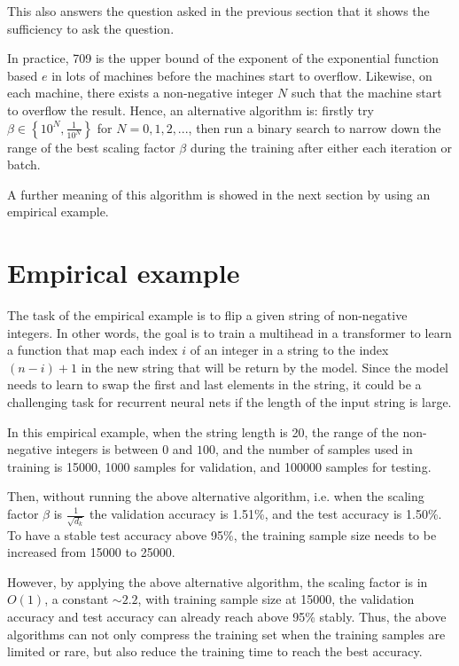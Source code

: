 \documentclass{article}
\theoremstyle{plain}
\theoremstyle{plain} %
\theoremstyle{definition}  %
\theoremstyle{remark}  %
\theoremstyle{plain}
\begin{document}
This also answers the question asked in the previous section that it shows the sufficiency to ask the question.


In practice, 709 is the upper bound of the exponent of the exponential function based $e$ in lots of machines before the machines start to overflow. Likewise, on each machine, there exists a non-negative integer $N$ such that the machine start to overflow the result. Hence, an alternative algorithm is: firstly try $ \beta \in \left\lbrace 10^N, \frac{1}{10^N} \right\rbrace$ for $N=0,1,2,...$, then run a binary search to narrow down the range of the best scaling factor $\beta$ during the training after either each iteration or batch.

A further meaning of this algorithm is showed in the next section by using an empirical example.


\section{Empirical example}

The task of the empirical example is to flip a given string of non-negative integers. In other words, the goal is to train a multihead in a transformer to learn a function that map each index $i$ of an integer in a string to the index $(n-i)+1$ in the new string that will be return by the model. Since the model needs to learn to swap the first and last elements in the string, it could be a challenging task for recurrent neural nets if the length of the input string is large.

In this empirical example, when the string length is 20, the range of the non-negative integers is between $0$ and $100$, and the number of samples used in training is 15000, 1000 samples for validation, and 100000 samples for testing. 

Then, without running the above alternative algorithm, i.e. when the scaling factor $\beta$ is $\frac{1}{\sqrt{d_k}}$ the validation accuracy is 1.51\%, and the test accuracy is 1.50\%. To have a stable test accuracy above 95\%, the training sample size needs to be increased from 15000 to 25000.

However, by applying the above alternative algorithm, the scaling factor is in $O(1)$, a constant $\sim 2.2$, with training sample size at 15000, the validation accuracy and test accuracy can already reach above 95\% stably. Thus, the above algorithms can not only compress the training set when the training samples are limited or rare, but also reduce the training time to reach the best accuracy.
\end{document}
